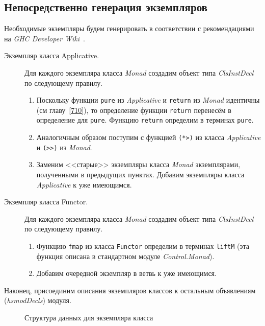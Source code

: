 \subsection{Непосредственно генерация экземпляров}\label{instgen}
Необходимые экземпляры будем генерировать в соответствии с рекомендациями на \textit{GHC Developer Wiki}~\autocite{migrat}.
\begin{description}
\item[Экземпляр класса Applicative.] Для каждого экземпляра класса \textit{Monad} создадим объект типа \textit{ClsInstDecl} по следующему правилу.
    \begin{enumerate}
        \item Поскольку функции \lstinline{pure} из \textit{Applicative} и \lstinline{return} из \textit{Monad} идентичны (см главу~\ref{710}), то определение функции \lstinline{return} перенесём в определение для \lstinline{pure}. Функцию \lstinline{return} определим в терминах \lstinline{pure}.
        \item Аналогичным образом поступим с функцией \lstinline{(*>)} из класса \textit{Applicative} и \lstinline{(>>)} из \textit{Monad}.
        \item Заменим <<старые>> экземпляры класса \textit{Monad} экземплярами, полученными в предыдущих пунктах. Добавим экземпляры класса \textit{Applicative} к уже имеющимся.
    \end{enumerate}
\item[Экземпляр класса Functor.] Для каждого экземпляра класса \textit{Monad} создадим объект типа \textit{ClsInstDecl} по следующему правилу.
    \begin{enumerate}
        \item Функцию \lstinline{fmap} из класса \lstinline{Functor} определим в терминах \lstinline{liftM} (эта функция описана в стандартном модуле \textit{Control.Monad}).
        \item Добавим очередной экземпляр в ветвь к уже имеющимся.
    \end{enumerate}
\end{description}

Наконец, присоединим описания экземпляров классов к остальным объявлениям (\textit{hsmodDecls}) модуля.

\begin{figure}[h]
\caption{Структура данных для экземпляра класса}\label{instance}
\end{figure}

